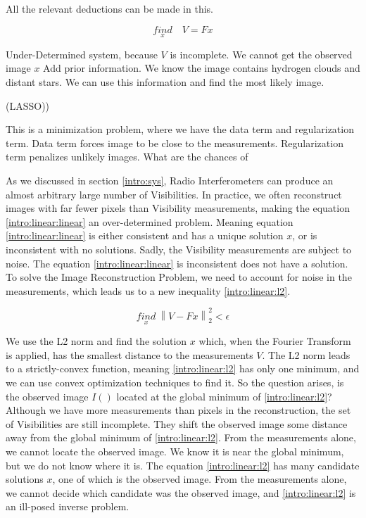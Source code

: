 All the relevant deductions can be made in this.

\begin{equation}\label{intro:linear:linear}
\underset{x}{find}\quad V = Fx
\end{equation}

Under-Determined system, because $V$ is incomplete. We cannot get the observed image $x$
Add prior information. We know the image contains hydrogen clouds and distant stars. We can use this information and find the most likely image.

(LASSO))

This is a minimization problem, where we have the data term and regularization term. Data term forces image to be close to the measurements. Regularization term penalizes unlikely images. What are the chances of




As we discussed in section \ref{intro:sys}, Radio Interferometers can produce an almost arbitrary large number of Visibilities. In practice, we often reconstruct images with far fewer pixels than Visibility measurements, making the equation \eqref{intro:linear:linear} an over-determined problem. Meaning equation \eqref{intro:linear:linear} is either consistent and has a unique solution $x$, or is inconsistent with no solutions. Sadly, the Visibility measurements are subject to noise. The equation \eqref{intro:linear:linear} is inconsistent does not have a solution. To solve the Image Reconstruction Problem, we need to account for noise in the measurements, which leads us to a new inequality \eqref{intro:linear:l2}.

\begin{equation}\label{intro:linear:l2}
\underset{x}{find} \: \left \| V - Fx \right \|_2^2 < \epsilon
\end{equation}

We use the L2 norm and find the solution $x$ which, when the Fourier Transform is applied, has the smallest distance to the measurements $V$. The L2 norm leads to a strictly-convex function, meaning \eqref{intro:linear:l2} has only one minimum, and we can use convex optimization techniques to find it. So the question arises, is the observed image $I()$ located at the global minimum of \eqref{intro:linear:l2}? Although we have more measurements than pixels in the reconstruction, the set of Visibilities are still incomplete. They shift the observed image some distance away from the global minimum of \eqref{intro:linear:l2}. From the measurements alone, we cannot locate the observed image. We know it is near the global minimum, but we do not know where it is. The equation \eqref{intro:linear:l2} has many candidate solutions $x$, one of which is the observed image.  From the measurements alone, we cannot decide which candidate was the observed image, and \eqref{intro:linear:l2} is an ill-posed inverse problem. 


